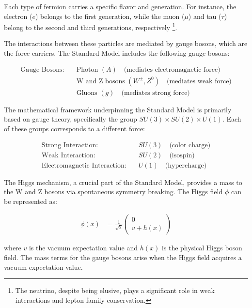 Each type of fermion carries a specific flavor and generation.
For instance, the electron ($e$) belongs to the first generation, while the muon ($\mu$) and tau ($\tau$) belong to the second and third generations, respectively \footnote{The neutrino, despite being elusive, plays a significant role in weak interactions and lepton family conservation.}.

The interactions between these particles are mediated by gauge bosons, which are the force carriers.
The Standard Model includes the following gauge bosons:

\begin{align}
\text{Gauge Bosons:} & \quad \text{Photon } (A) \quad \text{(mediates electromagnetic force)} \\
                    & \quad \text{W and Z bosons } (W^\pm, Z^0) \quad \text{(mediates weak force)} \\
                    & \quad \text{Gluons } (g) \quad \text{(mediates strong force)}
\end{align}

The mathematical framework underpinning the Standard Model is primarily based on gauge theory, specifically the group $SU(3) \times SU(2) \times U(1)$.
Each of these groups corresponds to a different force:

\begin{align}
\text{Strong Interaction:} & \quad SU(3) \quad \text{(color charge)} \\
\text{Weak Interaction:} & \quad SU(2) \quad \text{(isospin)} \\
\text{Electromagnetic Interaction:} & \quad U(1) \quad \text{(hypercharge)}
\end{align}

The Higgs mechanism, a crucial part of the Standard Model, provides a mass to the W and Z bosons via spontaneous symmetry breaking.
The Higgs field $\phi$ can be represented as:

\begin{align}
\phi(x) &= \frac{1}{\sqrt{2}} \begin{pmatrix} 0 \\ v + h(x) \end{pmatrix}
\end{align}

where $v$ is the vacuum expectation value and $h(x)$ is the physical Higgs boson field.
The mass terms for the gauge bosons arise when the Higgs field acquires a vacuum expectation value.

